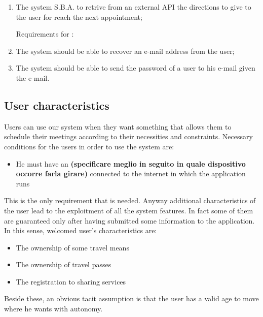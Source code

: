 \begin{enumerate}
\item The system S.B.A. to retrive from an external API the directions to give to the user for reach the next appointment;


Requirements for :

\item The system should be able to recover an e-mail address from the user;

\item The system should be able to send the password of a user to his e-mail given the e-mail.

\end{enumerate}

\subsection{User characteristics}
Users can use our system when they want something that allows them to schedule their meetings according to their necessities and constraints. Necessary conditions for the users in order to use the system are: 

\begin{itemize}
\item He must have an \textbf{(specificare meglio in seguito in quale dispositivo occorre farla girare)} connected to the internet in which the application runs
\end{itemize}

This is the only requirement that is needed. Anyway additional characteristics of the user lead to the exploitment of all the system features. In fact some of them are guaranteed only after having submitted some information to the application.
In this sense, welcomed user's characteristics are:

\begin{itemize}
\item The ownership of some travel means
\item The ownership of travel passes
\item The registration to sharing services
\end{itemize}

Beside these, an obvious tacit assumption is that the user has a valid age to move where he wants with autonomy.


